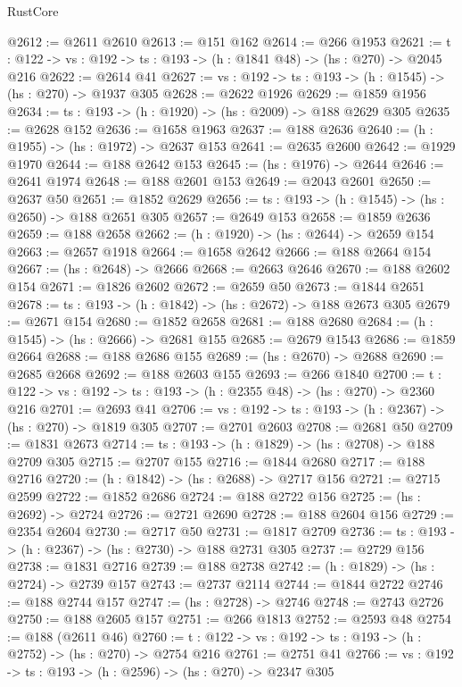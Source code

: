 \begin{lexlean}{RustCore}
\begin{coremodule}
@2612 := @2611 @2610
@2613 := @151 @162
@2614 := @266 @1953
@2621 := {t : @122} -> {vs : @192} -> {ts : @193} -> (h : @1841 @48) -> (hs : @270) -> @2045 @216
@2622 := @2614 @41
@2627 := {vs : @192} -> {ts : @193} -> (h : @1545) -> (hs : @270) -> @1937 @305
@2628 := @2622 @1926
@2629 := @1859 @1956
@2634 := {ts : @193} -> (h : @1920) -> (hs : @2009) -> @188 @2629 @305
@2635 := @2628 @152
@2636 := @1658 @1963
@2637 := @188 @2636
@2640 := (h : @1955) -> (hs : @1972) -> @2637 @153
@2641 := @2635 @2600
@2642 := @1929 @1970
@2644 := @188 @2642 @153
@2645 := (hs : @1976) -> @2644
@2646 := @2641 @1974
@2648 := @188 @2601 @153
@2649 := @2043 @2601
@2650 := @2637 @50
@2651 := @1852 @2629
@2656 := {ts : @193} -> (h : @1545) -> (hs : @2650) -> @188 @2651 @305
@2657 := @2649 @153
@2658 := @1859 @2636
@2659 := @188 @2658
@2662 := (h : @1920) -> (hs : @2644) -> @2659 @154
@2663 := @2657 @1918
@2664 := @1658 @2642
@2666 := @188 @2664 @154
@2667 := (hs : @2648) -> @2666
@2668 := @2663 @2646
@2670 := @188 @2602 @154
@2671 := @1826 @2602
@2672 := @2659 @50
@2673 := @1844 @2651
@2678 := {ts : @193} -> (h : @1842) -> (hs : @2672) -> @188 @2673 @305
@2679 := @2671 @154
@2680 := @1852 @2658
@2681 := @188 @2680
@2684 := (h : @1545) -> (hs : @2666) -> @2681 @155
@2685 := @2679 @1543
@2686 := @1859 @2664
@2688 := @188 @2686 @155
@2689 := (hs : @2670) -> @2688
@2690 := @2685 @2668
@2692 := @188 @2603 @155
@2693 := @266 @1840
@2700 := {t : @122} -> {vs : @192} -> {ts : @193} -> (h : @2355 @48) -> (hs : @270) -> @2360 @216
@2701 := @2693 @41
@2706 := {vs : @192} -> {ts : @193} -> (h : @2367) -> (hs : @270) -> @1819 @305
@2707 := @2701 @2603
@2708 := @2681 @50
@2709 := @1831 @2673
@2714 := {ts : @193} -> (h : @1829) -> (hs : @2708) -> @188 @2709 @305
@2715 := @2707 @155
@2716 := @1844 @2680
@2717 := @188 @2716
@2720 := (h : @1842) -> (hs : @2688) -> @2717 @156
@2721 := @2715 @2599
@2722 := @1852 @2686
@2724 := @188 @2722 @156
@2725 := (hs : @2692) -> @2724
@2726 := @2721 @2690
@2728 := @188 @2604 @156
@2729 := @2354 @2604
@2730 := @2717 @50
@2731 := @1817 @2709
@2736 := {ts : @193} -> (h : @2367) -> (hs : @2730) -> @188 @2731 @305
@2737 := @2729 @156
@2738 := @1831 @2716
@2739 := @188 @2738
@2742 := (h : @1829) -> (hs : @2724) -> @2739 @157
@2743 := @2737 @2114
@2744 := @1844 @2722
@2746 := @188 @2744 @157
@2747 := (hs : @2728) -> @2746
@2748 := @2743 @2726
@2750 := @188 @2605 @157
@2751 := @266 @1813
@2752 := @2593 @48
@2754 := @188 (@2611 @46)
@2760 := {t : @122} -> {vs : @192} -> {ts : @193} -> (h : @2752) -> (hs : @270) -> @2754 @216
@2761 := @2751 @41
@2766 := {vs : @192} -> {ts : @193} -> (h : @2596) -> (hs : @270) -> @2347 @305

\end{coremodule}
\end{lexlean}
